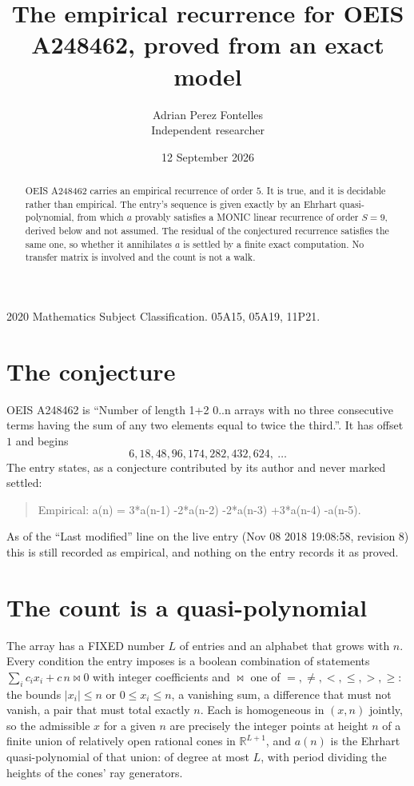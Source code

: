\documentclass[11pt,a4paper]{article}
\title{The empirical recurrence for OEIS A248462, proved from an exact model}
\author{Adrian Perez Fontelles\\ \small Independent researcher}
\date{12 September 2026}
\theoremstyle{plain}
\theoremstyle{definition}
\begin{document}
\maketitle

\begin{abstract}
OEIS A248462 carries an empirical recurrence of order $5$. It is true, and it is
decidable rather than empirical. The entry's sequence is given exactly by an Ehrhart quasi-polynomial, from
which $a$ provably satisfies a MONIC linear recurrence of order $S=9$, derived below and not
assumed. The residual of the conjectured recurrence satisfies the same one, so whether it
annihilates $a$ is settled by a finite exact computation. No transfer matrix is involved and
the count is not a walk.
\end{abstract}

\noindent\small 2020 Mathematics Subject Classification. 05A15, 05A19, 11P21.\normalsize

\section{The conjecture}

OEIS A248462 is ``Number of length 1+2 0..n arrays with no three consecutive terms having the sum of any two elements equal to twice the third.''. It has offset $1$ and begins
\[
6, 18, 48, 96, 174, 282, 432, 624,\ \dots
\]
The entry states, as a conjecture contributed by its author and never marked settled:
\begin{quote}
Empirical: a(n) = 3*a(n-1) -2*a(n-2) -2*a(n-3) +3*a(n-4) -a(n-5).
\end{quote}
As of the ``Last modified'' line on the live entry (Nov 08 2018 19:08:58, revision 8)
this is still recorded as empirical, and nothing on the entry records it as proved.

\section{The count is a quasi-polynomial}

The array has a FIXED number $L$ of entries and an alphabet that grows with $n$. Every
condition the entry imposes is a boolean combination of statements
$\sum_i c_ix_i + c\,n \bowtie 0$ with integer coefficients and $\bowtie$ one of
$=,\ne,<,\le,>,\ge$: the bounds $|x_i|\le n$ or $0\le x_i\le n$, a vanishing sum, a difference
that must not vanish, a pair that must total exactly $n$. Each is homogeneous in $(x,n)$
jointly, so the admissible $x$ for a given $n$ are precisely the integer points at height $n$
of a finite union of relatively open rational cones in $\mathbb{R}^{L+1}$, and $a(n)$ is
the Ehrhart quasi-polynomial of that union: of degree at most $L$, with period dividing the
heights of the cones' ray generators.
\end{document}
